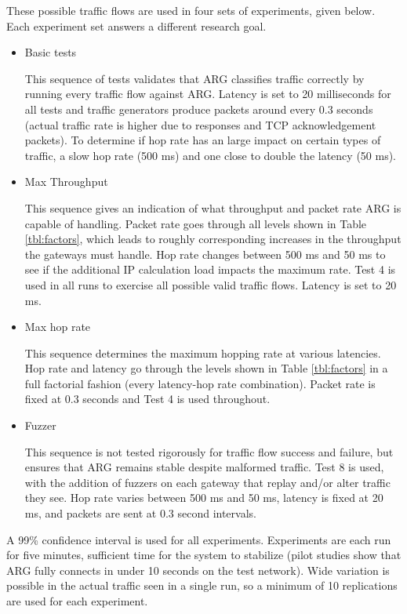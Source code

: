 \par These possible traffic flows are used in four sets of experiments, given below. Each experiment set answers a different research goal.
\begin{itemize}
	\item Basic tests
	\par This sequence of tests validates that \ac{ARG} classifies traffic correctly by running every traffic flow against \ac{ARG}. Latency is set to 20 milliseconds for all tests and traffic generators produce packets around every 0.3 seconds (actual traffic rate is higher due to responses and \ac{TCP} acknowledgement packets). To determine if hop rate has an large impact on certain types of traffic, a slow hop rate (500 ms) and one close to double the latency (50 ms).

	\item Max Throughput
	\par This sequence gives an indication of what throughput and packet rate \ac{ARG} is capable of handling. Packet rate goes through all levels shown in Table \ref{tbl:factors}, which leads to roughly corresponding increases in the throughput the gateways must handle. Hop rate changes between 500 ms and 50 ms to see if the additional \ac{IP} calculation load impacts the maximum rate. Test 4 is used in all runs to exercise all possible valid traffic flows. Latency is set to 20 ms.

	\item Max hop rate
	\par This sequence determines the maximum hopping rate at various latencies. Hop rate and latency go through the levels shown in Table \ref{tbl:factors} in a full factorial fashion (every latency-hop rate combination). Packet rate is fixed at 0.3 seconds and Test 4 is used throughout.

	\item Fuzzer
	\par This sequence is not tested rigorously for traffic flow success and failure, but ensures that \ac{ARG} remains stable despite malformed traffic. Test 8 is used, with the addition of fuzzers on each gateway that replay and/or alter traffic they see. Hop rate varies between 500 ms and 50 ms, latency is fixed at 20 ms, and packets are sent at 0.3 second intervals.
\end{itemize}

\par A 99\% confidence interval is used for all experiments. Experiments are each run for five minutes, sufficient time for the system to stabilize (pilot studies show that \ac{ARG} fully connects in under 10 seconds on the test network). Wide variation is possible in the actual traffic seen in a single run, so a minimum of 10 replications are used for each experiment.

